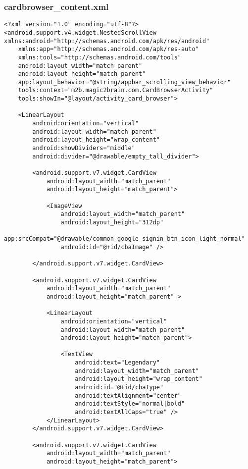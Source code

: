 \subsubsection{cardbrowser\_content.xml}
\begin{lstlisting}
<?xml version="1.0" encoding="utf-8"?>
<android.support.v4.widget.NestedScrollView xmlns:android="http://schemas.android.com/apk/res/android"
    xmlns:app="http://schemas.android.com/apk/res-auto"
    xmlns:tools="http://schemas.android.com/tools"
    android:layout_width="match_parent"
    android:layout_height="match_parent"
    app:layout_behavior="@string/appbar_scrolling_view_behavior"
    tools:context="m2b.magic2brain.com.CardBrowserActivity"
    tools:showIn="@layout/activity_card_browser">

    <LinearLayout
        android:orientation="vertical"
        android:layout_width="match_parent"
        android:layout_height="wrap_content"
        android:showDividers="middle"
        android:divider="@drawable/empty_tall_divider">

        <android.support.v7.widget.CardView
            android:layout_width="match_parent"
            android:layout_height="match_parent">

            <ImageView
                android:layout_width="match_parent"
                android:layout_height="312dp"
                app:srcCompat="@drawable/common_google_signin_btn_icon_light_normal"
                android:id="@+id/cbaImage" />

        </android.support.v7.widget.CardView>

        <android.support.v7.widget.CardView
            android:layout_width="match_parent"
            android:layout_height="match_parent" >

            <LinearLayout
                android:orientation="vertical"
                android:layout_width="match_parent"
                android:layout_height="match_parent">

                <TextView
                    android:text="Legendary"
                    android:layout_width="match_parent"
                    android:layout_height="wrap_content"
                    android:id="@+id/cbaType"
                    android:textAlignment="center"
                    android:textStyle="normal|bold"
                    android:textAllCaps="true" />
            </LinearLayout>
        </android.support.v7.widget.CardView>

        <android.support.v7.widget.CardView
            android:layout_width="match_parent"
            android:layout_height="match_parent">


\end{lstlisting}

